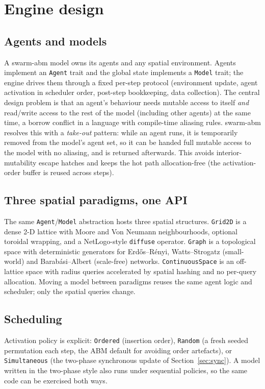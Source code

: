 \documentclass[review]{elsarticle}
\begin{document}
\section{Engine design}
\label{sec:design}

\subsection{Agents and models}
A swarm-abm model owns its agents and any spatial environment. Agents implement
an \texttt{Agent} trait and the global state implements a \texttt{Model} trait;
the engine drives them through a fixed per-step protocol (environment update,
agent activation in scheduler order, post-step bookkeeping, data collection).
The central design problem is that an agent's behaviour needs mutable access to
itself \emph{and} read/write access to the rest of the model (including other
agents) at the same time, a borrow conflict in a language with compile-time
aliasing rules. swarm-abm resolves this with a \emph{take-out} pattern: while an
agent runs, it is temporarily removed from the model's agent set, so it can be
handed full mutable access to the model with no aliasing, and is returned
afterwards. This avoids interior-mutability escape hatches and keeps the hot
path allocation-free (the activation-order buffer is reused across steps).

\subsection{Three spatial paradigms, one API}
The same \texttt{Agent}/\texttt{Model} abstraction hosts three spatial
structures. \texttt{Grid2D} is a dense 2-D lattice with Moore and Von Neumann
neighbourhoods, optional toroidal wrapping, and a NetLogo-style \texttt{diffuse}
operator. \texttt{Graph} is a topological space with deterministic generators
for Erd\H{o}s--R\'enyi, Watts--Strogatz (small-world) and Barab\'asi--Albert
(scale-free) networks. \texttt{ContinuousSpace} is an off-lattice space with
radius queries accelerated by spatial hashing and no per-query allocation.
Moving a model between paradigms reuses the same agent logic and scheduler;
only the spatial queries change.

\subsection{Scheduling}
Activation policy is explicit: \texttt{Ordered} (insertion order),
\texttt{Random} (a fresh seeded permutation each step, the ABM default for
avoiding order artefacts), or \texttt{Simultaneous} (the two-phase synchronous
update of Section~\ref{sec:sync}). A model written in the two-phase style also
runs under sequential policies, so the same code can be exercised both ways.
\end{document}
